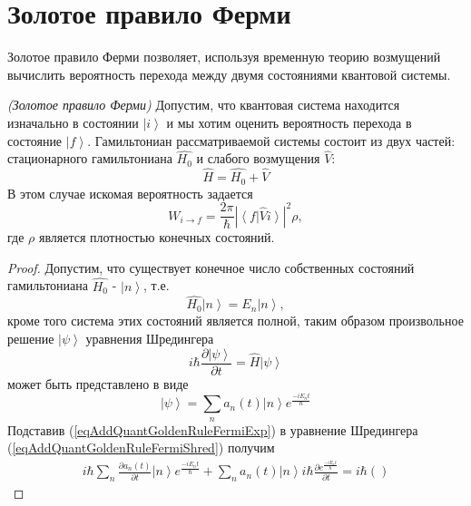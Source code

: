 \section{Золотое правило Ферми}
Золотое правило Ферми позволяет, используя временную теорию возмущений
вычислить вероятность перехода между двумя состояниями квантовой
системы.

\begin{theorem}
\emph{(Золотое правило Ферми)}
\label{addQuantGoldenRuleFermi}
Допустим, что квантовая система находится изначально в состоянии
$\left|i\right>$ и мы хотим оценить вероятность перехода в состояние 
$\left|f\right>$. Гамильтониан рассматриваемой системы состоит из
двух частей: стационарного гамильтониана $\hat{H_0}$ и слабого
возмущения $\hat{V}$:
\begin{equation}
  \hat{H} = \hat{H_0} + \hat{V}
  \nonumber
\end{equation}
В этом случае искомая вероятность задается
\begin{equation}
  W_{i \rightarrow f} = \frac{2 \pi}{\hbar}
  \left|
  \left<
  f
  \right|
  \hat{V}
  \left.
  i
  \right>
  \right|^2 \rho
  \nonumber,
\end{equation}
где $\rho$ является плотностью конечных состояний.
\end{theorem}

\begin{proof}
Допустим, что существует конечное число собственных состояний
гамильтониана $\hat{H_0}$ - $\left|n\right>$, т.е.
\begin{equation}
  \hat{H_0} \left| n \right> = E_n \left| n \right>,
  \nonumber
\end{equation}
кроме того система этих состояний является полной,
таким образом произвольное решение
$\left|\psi\right>$
уравнения Шредингера
\begin{equation}
  i \hbar \frac{\partial \left|\psi\right>}{\partial t} =
  \hat{H} \left|\psi\right>
  \label{eqAddQuantGoldenRuleFermiShred}
\end{equation}
может быть представлено в виде
\begin{equation}
  \left|\psi\right> = \sum_n a_n\left(t\right) \left|n\right>
  e^{\frac{-i E_n t}{\hbar}}
  \label{eqAddQuantGoldenRuleFermiExp}
\end{equation}
Подставив (\ref{eqAddQuantGoldenRuleFermiExp}) в уравнение Шредингера
(\ref{eqAddQuantGoldenRuleFermiShred}) получим
\begin{eqnarray}
  i \hbar \sum_n \frac{ \partial a_n\left(t\right)}{\partial t }
  \left|n\right> e^{\frac{-i E_n t}{\hbar}} +
  \sum_n a_n\left(t\right) \left|n\right>
  i \hbar \frac{\partial e^{\frac{-i E_n t}{\hbar}}}{ \partial t} =
  i \hbar \left( \right)
  \nonumber
\end{eqnarray}

\end{proof}
